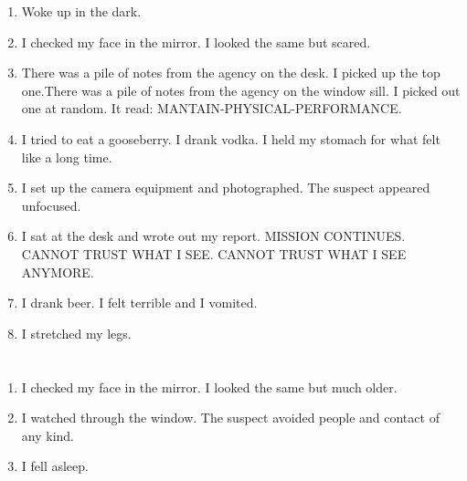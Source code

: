 \documentclass{article}
\begin{document}
    \begin{enumerate}
    
    \item Woke up in the dark.\\
    
    \item I checked my face in the mirror. I looked the same but scared.\\
    
    \item There was a pile of notes from the agency on the desk. I picked up the top one.There was a pile of notes from the agency on the window sill. I picked out one at random. It read: MANTAIN-PHYSICAL-PERFORMANCE.\\
    
    \item I tried to eat a gooseberry. I drank vodka. I held my stomach for what felt like a long time.\\
    
    \item I set up the camera equipment and photographed. The suspect appeared unfocused.\\
    
    \item I sat at the desk and wrote out my report. MISSION CONTINUES. CANNOT TRUST WHAT I SEE. CANNOT TRUST WHAT I SEE ANYMORE.\\
    
    \item I drank beer. I felt terrible and I vomited.\\
    
    \item I stretched my legs.\\
    
    \end{enumerate}
     
    \newpage
    
    \section{}
    
    \begin{enumerate}
    
    \item I checked my face in the mirror. I looked the same but much older.\\
    
    \item I watched through the window. The suspect avoided people and contact of any kind.\\
    
    \item I fell asleep.\\
    
    \end{enumerate}
     
\end{document}
